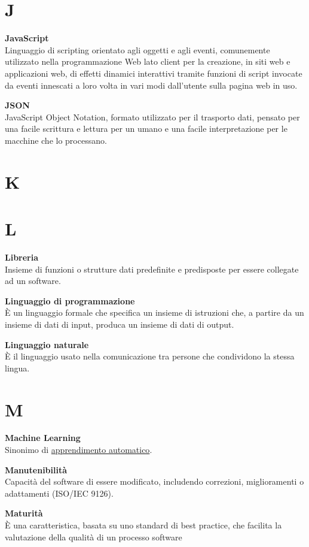 \documentclass[a4paper, oneside, openany, dvipsnames, table, 12pt]{article}
\begin{document}
\newpage
\section{J}
\textbf{JavaScript}\\	
Linguaggio di scripting orientato agli oggetti e agli eventi, comunemente utilizzato nella programmazione Web lato client per la creazione, in siti web e applicazioni web, di effetti dinamici interattivi tramite funzioni di script invocate da eventi innescati a loro volta in vari modi dall'utente sulla pagina web in uso.

\textbf{JSON} \\
JavaScript Object Notation, formato utilizzato per il trasporto dati, pensato
per una facile scrittura e lettura per un umano e una facile interpretazione per
le macchine che lo processano.

\newpage
\section{K}

\newpage
\section{L}
\textbf{Libreria} \\
Insieme di funzioni o strutture dati predefinite e predisposte per essere collegate ad un software. 

\textbf{Linguaggio di programmazione} \\
È un linguaggio formale che specifica un insieme di istruzioni che, a partire da un insieme di dati di input, produca un insieme di dati di output.

\textbf{Linguaggio naturale} \\
È il linguaggio usato nella comunicazione tra persone che condividono la stessa lingua.

\newpage
\section{M}
\textbf{Machine Learning} \\
Sinonimo di \hyperref[par:appr_auto]{apprendimento automatico\glo}.

\textbf{Manutenibilità} \\
Capacità del software di essere modificato, includendo correzioni, miglioramenti o adattamenti (ISO/IEC 9126).

\textbf{Maturità} \\
È una caratteristica, basata su uno standard di best practice\glo, che facilita la valutazione della qualità di un processo software
\end{document}
